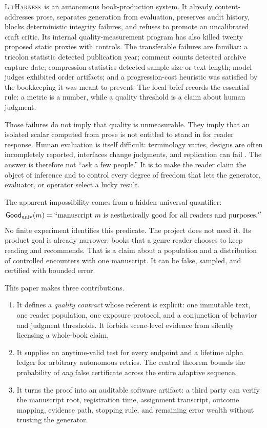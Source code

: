 \documentclass[11pt]{article}
\theoremstyle{remark}
\newcommand{\system}{\textsc{LitHarness}}
\newcommand{\good}{\mathsf{Good}}
\begin{document}
\system\ is an autonomous book-production system. It already content-addresses prose,
separates generation from evaluation, preserves audit history, blocks deterministic
integrity failures, and refuses to promote an uncalibrated craft critic. Its internal
quality-measurement program has also killed twenty proposed static proxies with controls.
The transferable failures are familiar: a tricolon statistic detected publication year;
comment counts detected archive capture date; compression statistics detected sample size
or text length; model judges exhibited order artifacts; and a progression-cost heuristic
was satisfied by the bookkeeping it was meant to prevent. The local brief records the
essential rule: a metric is a number, while a quality threshold is a claim about human
judgment.

Those failures do not imply that quality is unmeasurable. They imply that an isolated scalar
computed from prose is not entitled to stand in for reader response. Human evaluation is
itself difficult: terminology varies, designs are often incompletely reported, interfaces
change judgments, and replication can fail \cite{vanderlee2021,howcroft2020,khashabi2022}.
The answer is therefore not ``ask a few people.'' It is to make the reader claim the object
of inference and to control every degree of freedom that lets the generator, evaluator, or
operator select a lucky result.

The apparent impossibility comes from a hidden universal quantifier:
\[
  \good_{\mathrm{univ}}(m)
  = ``\text{manuscript $m$ is aesthetically good for all readers and purposes}.''
\]
No finite experiment identifies this predicate. The project does not need it. Its product
goal is already narrower: books that a genre reader chooses to keep reading and recommends.
That is a claim about a population and a distribution of controlled encounters with one
manuscript. It can be false, sampled, and certified with bounded error.

This paper makes three contributions.

\begin{enumerate}
  \item It defines a \emph{quality contract} whose referent is explicit: one immutable text,
  one reader population, one exposure protocol, and a conjunction of behavior and judgment
  thresholds. It forbids scene-level evidence from silently licensing a whole-book claim.
  \item It supplies an anytime-valid test for every endpoint and a lifetime alpha ledger for
  arbitrary autonomous retries. The central theorem bounds the probability of \emph{any}
  false certificate across the entire adaptive sequence.
  \item It turns the proof into an auditable software artifact: a third party can verify the
  manuscript root, registration time, assignment transcript, outcome mapping, evidence
  path, stopping rule, and remaining error wealth without trusting the generator.
\end{enumerate}
\end{document}
